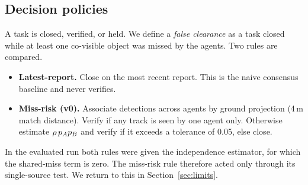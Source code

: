 \subsection{Decision policies}
A task is closed, verified, or held. We define a \emph{false clearance} as a
task closed while at least one co-visible object was missed by the agents.
Two rules are compared.
\begin{itemize}
  \item \textbf{Latest-report.} Close on the most recent report. This is the
        naive consensus baseline and never verifies.
  \item \textbf{Miss-risk (v0).} Associate detections across agents by ground
        projection (4\,m match distance). Verify if any track is seen by one
        agent only. Otherwise estimate $\rho\,p_A p_B$ and verify if it
        exceeds a tolerance of 0.05, else close.
\end{itemize}
In the evaluated run both rules were given the independence estimator, for
which the shared-miss term is zero. The miss-risk rule therefore acted only
through its single-source test. We return to this in
Section~\ref{sec:limits}.
